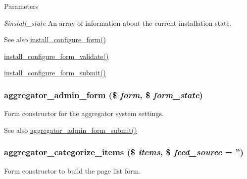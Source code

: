 \begin{DoxyParams}{Parameters}
\item[{\em \$install\_\-state}]An array of information about the current installation state.\end{DoxyParams}
\begin{DoxySeeAlso}{See also}
\hyperlink{group__forms_ga38e5d79d667dbc48f40ca4238d6d161b}{install\_\-configure\_\-form()} 

\hyperlink{install_8core_8inc_a6b3794048999c91eed0b6a7633a8e8f3}{install\_\-configure\_\-form\_\-validate()} 

\hyperlink{install_8core_8inc_ac4774b453669916d9ffbb619b4bf9717}{install\_\-configure\_\-form\_\-submit()} 
\end{DoxySeeAlso}
\hypertarget{group__forms_gaf74e45e5f77c20f8e8483e13aea0d25c}{
\subsubsection[{aggregator\_\-admin\_\-form}]{\setlength{\rightskip}{0pt plus 5cm}aggregator\_\-admin\_\-form (\$ {\em form}, \/  \$ {\em form\_\-state})}}
\label{group__forms_gaf74e45e5f77c20f8e8483e13aea0d25c}
Form constructor for the aggregator system settings.

\begin{DoxySeeAlso}{See also}
\hyperlink{aggregator_8admin_8inc_a9cabb7efcb8d2475b259921beffc8776}{aggregator\_\-admin\_\-form\_\-submit()} 
\end{DoxySeeAlso}
\hypertarget{group__forms_gad110881d125af4a6c5c2182a52fe4c69}{
\subsubsection[{aggregator\_\-categorize\_\-items}]{\setlength{\rightskip}{0pt plus 5cm}aggregator\_\-categorize\_\-items (\$ {\em items}, \/  \$ {\em feed\_\-source} = {\ttfamily ''})}}
\label{group__forms_gad110881d125af4a6c5c2182a52fe4c69}
Form constructor to build the page list form.


